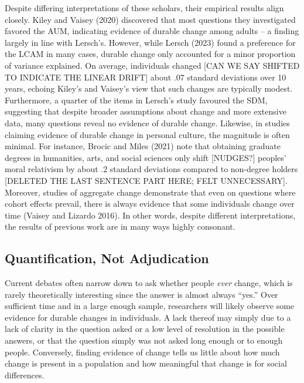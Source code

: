 \documentclass[
  11pt,
]{article}
\begin{document}
Despite differing interpretations of these scholars, their empirical
results align closely. Kiley and Vaisey (2020) discovered that most
questions they investigated favored the AUM, indicating evidence of
durable change among adults -- a finding largely in line with Lersch's.
However, while Lersch (2023) found a preference for the LCAM in many
cases, durable change only accounted for a minor proportion of variance
explained. On average, individuals changed {[}CAN WE SAY SHIFTED TO
INDICATE THE LINEAR DRIFT{]} about .07 standard deviations over 10
years, echoing Kiley's and Vaisey's view that such changes are typically
modest. Furthermore, a quarter of the items in Lersch's study favoured
the SDM, suggesting that despite broader assumptions about change and
more extensive data, many questions reveal no evidence of durable
change. Likewise, in studies claiming evidence of durable change in
personal culture, the magnitude is often minimal. For instance, Brocic
and Miles (2021) note that obtaining graduate degrees in humanities,
arts, and social sciences only shift {[}NUDGES?{]} peoples' moral
relativism by about .2 standard deviations compared to non-degree
holders {[}DELETED THE LAST SENTENCE PART HERE; FELT UNNECESSARY{]}.
Moreover, studies of aggregate change demonstrate that even on questions
where cohort effects prevail, there is always evidence that some
individuals change over time (Vaisey and Lizardo 2016). In other words,
despite different interpretations, the results of previous work are in
many ways highly consonant.

\hypertarget{quantification-not-adjudication}{%
\subsection{Quantification, Not
Adjudication}\label{quantification-not-adjudication}}

Current debates often narrow down to ask whether people \emph{ever}
change, which is rarely theoretically interesting since the answer is
almost always ``yes.'' Over sufficient time and in a large enough
sample, researchers will likely observe some evidence for durable
changes in individuals. A lack thereof may simply due to a lack of
clarity in the question asked or a low level of resolution in the
possible answers, or that the question simply was not asked long enough
or to enough people. Conversely, finding evidence of change tells us
little about how much change is present in a population and how
meaningful that change is for social differences.
\end{document}
